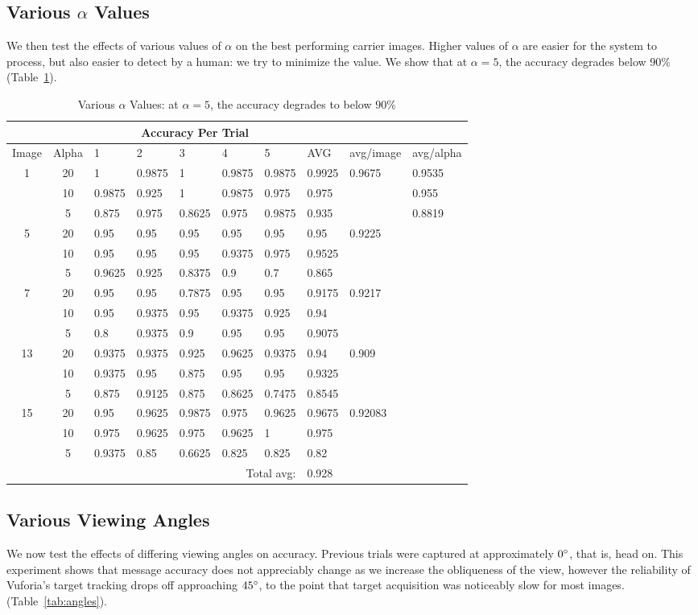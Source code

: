\documentclass[11pt, letterpaper]{article}
\begin{document}
\subsection{Various $\alpha$ Values}
We then test the effects of various values of $\alpha$ on the best performing carrier images.
Higher values of $\alpha$ are easier for the system to process, but also easier to detect by a human: we try to minimize the value.
We show that at $\alpha = 5$, the accuracy degrades below $90 \% $ (Table~\ref{tab:alpha}).
\begin{table}[t]
\label{tab:alpha}
\caption{Various $\alpha$ Values: at $\alpha = 5$, the accuracy degrades to below $90 \% $}
\centering
\begin{tabular}{c c | l l l l l l l l}
\\
&&\multicolumn{5}{c}{Accuracy Per Trial}&&&\\ 
\toprule
Image&Alpha&1&2&3&4&5&AVG&avg/image&avg/alpha\\ 
\midrule
1&20&1&0.9875&1&0.9875&0.9875&0.9925&0.9675&0.9535\\ 
&10&0.9875&0.925&1&0.9875&0.975&0.975&&0.955\\ 
&5&0.875&0.975&0.8625&0.975&0.9875&0.935&&0.8819\\ 
5&20&0.95&0.95&0.95&0.95&0.95&0.95&0.9225&\\ 
&10&0.95&0.95&0.95&0.9375&0.975&0.9525&&\\ 
&5&0.9625&0.925&0.8375&0.9&0.7&0.865&&\\ 
7&20&0.95&0.95&0.7875&0.95&0.95&0.9175&0.9217&\\ 
&10&0.95&0.9375&0.95&0.9375&0.925&0.94&&\\ 
&5&0.8&0.9375&0.9&0.95&0.95&0.9075&&\\ 
13&20&0.9375&0.9375&0.925&0.9625&0.9375&0.94&0.909&\\ 
&10&0.9375&0.95&0.875&0.95&0.95&0.9325&&\\ 
&5&0.875&0.9125&0.875&0.8625&0.7475&0.8545&&\\ 
15&20&0.95&0.9625&0.9875&0.975&0.9625&0.9675&0.92083&\\ 
&10&0.975&0.9625&0.975&0.9625&1&0.975&&\\ 
&5&0.9375&0.85&0.6625&0.825&0.825&0.82&&\\ 
\bottomrule 
&&&&&\multicolumn{2}{r}{Total avg:}&0.928&&\\ 
\end{tabular}
\end{table}

\subsection{Various Viewing Angles}
We now test the effects of differing viewing angles on accuracy. Previous trials were captured at approximately $0 \degree$, that is, head on. This experiment shows that message accuracy does not appreciably change as we increase the obliqueness of the view, however the reliability of Vuforia's target tracking drops off approaching $45 \degree$, to the point that target acquisition was noticeably slow for most images. (Table~\ref{tab:angles}).
\end{document}
